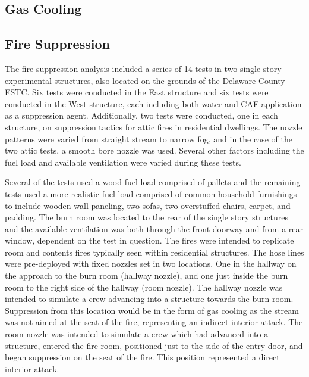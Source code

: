\documentclass[12pt,oneside]{book}
\begin{document}
\subsection{Gas Cooling}
\label{sec:Gas_Cooling}



\subsection{Fire Suppression}
\label{sec:Fire_Suppression}

The fire suppression analysis included a series of 14 tests in two single story experimental structures, also located on the grounds of the Delaware County ESTC. Six tests were conducted in the East structure and six tests were conducted in the West structure, each including both water and CAF application as a suppression agent. Additionally, two tests were conducted, one in each structure, on suppression tactics for attic fires in residential dwellings. The nozzle patterns were varied from straight stream to narrow fog, and in the case of the two attic tests, a smooth bore nozzle was used. Several other factors including the fuel load and available ventilation were varied during these tests.

Several of the tests used a wood fuel load comprised of pallets and the remaining tests used a more realistic fuel load comprised of common household furnishings to include wooden wall paneling, two sofas, two overstuffed chairs, carpet, and padding.  The burn room was located to the rear of the single story structures and the available ventilation was both through the front doorway and from a rear window, dependent on the test in question.  The fires were intended to replicate room and contents fires typically seen within residential structures.  The hose lines were pre-deployed with fixed nozzles set in two locations.  One in the hallway on the approach to the burn room (hallway nozzle), and one just inside the burn room to the right side of the hallway (room nozzle). The hallway nozzle was intended to simulate a crew advancing into a structure towards the burn room. Suppression from this location would be in the form of gas cooling as the stream was not aimed at the seat of the fire, representing an indirect interior attack. The room nozzle was intended to simulate a crew which had advanced into a structure, entered the fire room, positioned just to the side of the entry door, and began suppression on the seat of the fire.  This position represented a direct interior attack.
\end{document}
